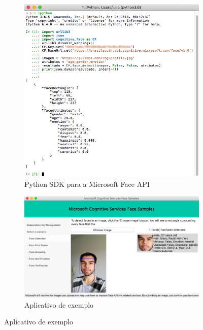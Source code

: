 \begin{figure}[htbp]
    \centering
    \caption{Teste da Microsoft Face API}
    \label{fig:face_api_test}
    \begin{subfigure}[t]{0.9\textwidth}
    \centering
    \includegraphics[width=0.8\linewidth]{imagens/msft_face_api_json.png}
    \caption{Python SDK para a Microsoft Face API} \label{fig:face_api_test:b}
    \end{subfigure}
    
    \vspace{\floatsep}
    \begin{subfigure}[t]{0.9\textwidth}
    \centering
    \includegraphics[width=0.8\linewidth]{imagens/msft_face_api_test.png}
    \caption{Aplicativo de exemplo} \label{fig:face_api_test:a}
    \end{subfigure}
\end{figure}